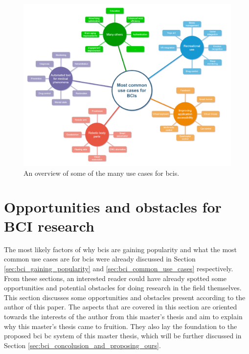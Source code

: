 \begin{figure}[ht]
    \centering
    \includegraphics[width=0.7\linewidth]{../images/introduction/use_cases_overview.pdf}
    \captionsetup{width=0.7\linewidth}
    \captionsetup{justification=centering}
    \caption{An overview of some of the many use cases for \glspl{bci}.} 
    \label{fig:bci_use_cases_diagram}
\end{figure}




\section{Opportunities and obstacles for BCI research}
\label{sec:bci_opportunities_obstacles}

The most likely factors of why \glspl{bci} are gaining popularity and what the most common use cases are for \glspl{bci} were already discussed in Section \ref{sec:bci_gaining_popularity} and \ref{sec:bci_common_use_cases} respectively.
From these sections, an interested reader could have already spotted some opportunities and potential obstacles for doing research in the field themselves.
This section discusses some opportunities and obstacles present according to the author of this paper.
The aspects that are covered in this section are oriented towards the interests of the author from this master's thesis and aim to explain why this master's thesis came to fruition.
They also lay the foundation to the proposed \gls{bci} \gls{bc} system of this master thesis, which will be further discussed in Section \ref{sec:bci_concolusion_and_proposing_ours}.


